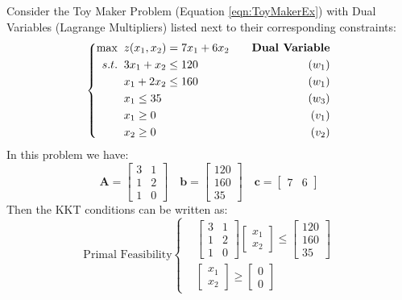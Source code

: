 \begin{example}
Consider the Toy Maker Problem (Equation \ref{eqn:ToyMakerEx}) with Dual Variables (Lagrange Multipliers) listed next to their corresponding constraints:
\begin{displaymath}
\left\{
\begin{aligned}
\max\;\;& z(x_1,x_2) = 7x_1 + 6x_2 & \quad \text{\textbf{Dual Variable}}\\
s.t.\;\;&  3x_1 + x_2 \leq 120 & \quad (w_1)\\
& x_1 + 2x_2 \leq 160 & \quad (w_1)\\
& x_1 \leq 35 & \quad (w_3)\\
& x_1 \geq 0 & \quad (v_1)\\
& x_2 \geq 0 & \quad (v_2)
\end{aligned}
\right.
\end{displaymath}
In this problem we have:
\begin{displaymath}
\mathbf{A} = \begin{bmatrix}
3 & 1\\
1 & 2 \\
1 & 0
\end{bmatrix}\quad \mathbf{b} = \begin{bmatrix}120\\160\\35\end{bmatrix} \quad
\mathbf{c} = \begin{bmatrix}7 & 6\end{bmatrix}
\end{displaymath}
Then the KKT conditions can be written as:
\begin{displaymath}
\text{Primal Feasibility}\left\{
\begin{aligned}
& \begin{bmatrix}
3 & 1\\
1 & 2 \\
1 & 0
\end{bmatrix}\begin{bmatrix}x_1\\x_2\end{bmatrix} \leq \begin{bmatrix}120\\160\\35\end{bmatrix}\\
& \begin{bmatrix}x_1\\x_2\end{bmatrix} \geq \begin{bmatrix}0\\0\end{bmatrix}

\end{aligned}
\end{displaymath}
\end{example}
